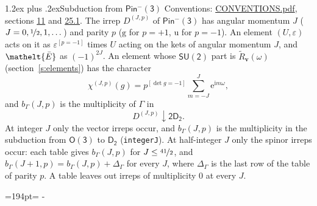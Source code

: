\documentclass[10pt,a4paper]{article}
\makeatletter
\renewcommand\section{\@startsection{section}{1}{\z@}{-3ex plus -1ex minus -.2ex}%
  {1.2ex plus .2ex}{\normalfont\large\sffamily\bfseries\color{parttitle}}}
\newcommand{\needspace}[1]{\par\penalty-100\begingroup\dimen0=#1\relax\dimen2=\pagegoal
  \advance\dimen2-\pagetotal\ifdim\dimen0>\dimen2\relax\ifdim\dimen2>0pt\vfil\break\fi\fi
  \endgroup}
\numberwithin{equation}{section}
\newcommand{\eltfont}[1]{{\let\sigma\eltsigma\mathelt{#1}}}
\newcommand{\grp}[1]{\mathsf{#1}}
\newcommand{\elt}[1]{\eltfont{#1}}
\newcommand{\ptag}[1]{\mathrm{#1}}
\newcommand{\iverson}[1]{[#1]}
\newcommand{\restr}[2]{#1\!\downarrow#2}
\newcommand{\vv}{\mathbf{v}}
\newcommand{\iunit}{\mathrm{i}}
\newcommand{\expe}{\mathrm{e}}
\newcommand{\irrJp}[2]{D^{(#1,#2)}}
\newcommand{\barred}[1]{\bar{#1}}
\newcommand{\lift}[1]{\tilde{#1}}
\makeatother
\begin{document}
\section{Subduction from \texorpdfstring{$\grp{Pin^{-}(3)}$}{Pin(3)}}\label{s:subduction_parent}
Conventions: \href{../../CONVENTIONS.pdf}{CONVENTIONS.pdf}, sections \href{../../../rotation/CONVENTIONS.pdf\#conv.11}{11} and \href{../../CONVENTIONS.pdf\#conv.25.1}{25.1}.
\leavevmode\label{n:index.J}\label{n:index.parity}\label{n:irrep.o3}The irrep $\irrJp{J}{p}$ of \href{Pinminus3.pdf}{$\grp{Pin^{-}(3)}$} has angular momentum $J$ ($J = 0, \nicefrac{1}{2}, 1, \dots$) and parity $p$ ($\ptag{g}$ for $p = +1$, $\ptag{u}$ for $p = -1$). An element $(U, \varepsilon)$ acts on it as $\varepsilon^{[p = -1]}$ times $U$ acting on the kets of angular momentum $J$, and $\elt{\barred{E}}$ as $(-1)^{2J}$. \label{n:function.character.parent}\label{n:function.multiplicity}An element whose $\grp{SU(2)}$ part is $\lift{R}_{\vv}(\omega)$ (section~\ref{s:elements}) has the character
\begin{equation}\label{e:chi}\chi^{(J,p)}(g) = p^{\iverson{\det g = -1}}\sum_{m=-J}^{J} \expe^{\iunit m\omega},\end{equation}
and $b_\Gamma(J, p)$ is the multiplicity of $\Gamma$ in
\begin{equation}\label{e:parent}\restr{\irrJp{J}{p}}{\grp{2D_{2}}}.\end{equation}
At integer $J$ only the vector irreps occur, and $b_\Gamma(J, p)$ is the multiplicity in the subduction from $\grp{O(3)}$ to \href{../../../rotation/data/pdf/D2.pdf}{$\grp{D_{2}}$} (\texttt{integerJ}). \label{n:index.increment}At half-integer $J$ only the spinor irreps occur: each table gives $b_\Gamma(J, p)$ for $J \le \nicefrac{41}{2}$, and $b_\Gamma(J + 1, p) = b_\Gamma(J, p) + \Delta_\Gamma$ for every $J$, where $\Delta_\Gamma$ is the last row of the table of parity $p$. A table leaves out irreps of multiplicity 0 at every $J$.
\needspace{194pt}
\end{document}
